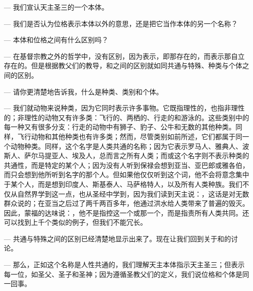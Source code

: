— 我们宣认天主圣三的一个本体。\par

— 我们是否认为位格表示本体以外的意思，还是把它当作本体的另一个名称？\par

— 本体和位格之间有什么区别吗？\par

— 在基督宗教之外的哲学中，没有区别，因为表示，即那存在的，而表示那自立存在的。但是根据教父们的教导，和之间的区别就如同共通与特殊、种类与个体之间的区别。\par

— 请你更清楚地告诉我，什么是种类、类别和个体。\par

— 我们就动物来说种类，因为它同时表示许多事物。它既指理性的，也指非理性的；非理性的动物又有许多类：飞行的、两栖的、行走的和游泳的。这些类别中的每一种又有很多分支：行走的动物中有狮子、豹子、公牛和无数的其他种类。同样，飞行动物和其他种类也有许多类；然而，尽管类别如前所述，它们都属于同一个动物种类。同样，这个名字是人类共通的名称；因为它表示罗马人、雅典人、波斯人、萨尔马提亚人、埃及人，总而言之所有人类；而或这个名字则不表示种类的共通性，而是特定的某个人；因为没有人听到保禄会想到亚当、亚巴郎或雅各伯，而只会想到他所听到名字的那个人。但如果他仅仅听到这个词，他不会将意念集中于某个人，而是想到印度人、斯基泰人、马萨格特人，以及所有人类种族。我们不仅从自然界学到这一点，也从圣经中学到，因为我们读到天主说：，这话是对无数群众说的；在亚当之后过了两千两百多年，他通过洪水给人类带来了普遍的毁灭。因此，蒙福的达味说：，他不是指控这一个或那一个，而是指责所有人类共同。还可以找到上千个类似的例子，但我们不能冗长。\par

— 共通与特殊之间的区别已经清楚地显示出来了。现在让我们回到关于和的讨论。\par

— 那么，正如这个名称是人性共通的，我们理解天主本体指示天主圣三；但表示每一位，如圣父、圣子和圣神；因为遵循圣教父们的定义，我们说位格和个体是同一回事。\par

